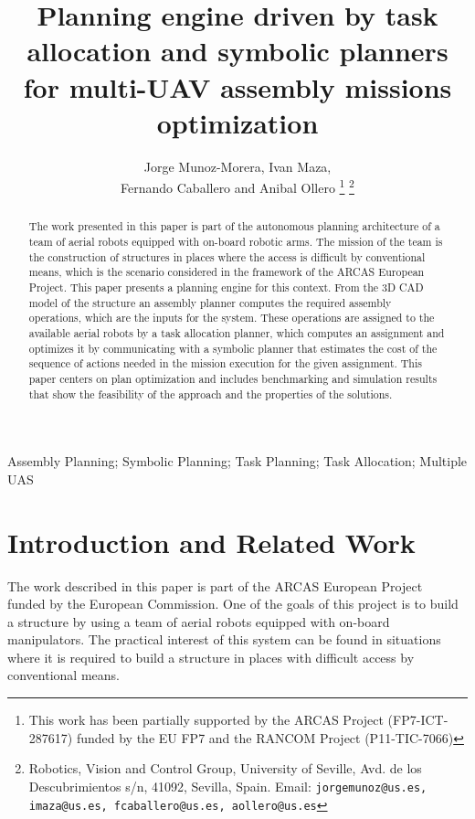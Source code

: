\documentclass[letterpaper, 12pt, conference]{ieeeconf}    %
\title{\LARGE \bf Planning engine driven by task allocation and symbolic planners for multi-UAV assembly missions optimization}
\author{Jorge Munoz-Morera, Ivan Maza, \\ Fernando Caballero and Anibal Ollero   %
\thanks{This work has been partially supported by the ARCAS Project (FP7-ICT-287617) funded by the EU FP7 and the RANCOM Project (P11-TIC-7066)} %
\thanks{Robotics, Vision and Control Group, University of Seville, Avd. de los Descubrimientos s/n, 41092, Sevilla, Spain. Email:
{\tt\small jorgemunoz@us.es, imaza@us.es, fcaballero@us.es, aollero@us.es}}
}
\begin{document}
\maketitle

\thispagestyle{empty}

\pagestyle{empty}

\begin{abstract}
The work presented in this paper is part of the autonomous planning architecture of a team of aerial robots equipped with on-board robotic arms. The mission of the team is the construction of structures in places where the access is difficult by conventional means, which is the scenario considered in the framework of the ARCAS European Project. This paper presents a planning engine for this context. From the 3D CAD model of the structure an assembly planner computes the required assembly operations, which are the inputs for the system. These operations are assigned to the available aerial robots by a task allocation planner, which computes an assignment and optimizes it by communicating with a symbolic planner that estimates the cost of the sequence of actions needed in the mission execution for the given assignment. This paper centers on plan optimization and includes benchmarking and simulation results that show the feasibility of the approach and the properties of the solutions.  
\end{abstract}
 

\begin{keywords}
Assembly Planning; Symbolic Planning; Task Planning; Task Allocation; Multiple UAS
\end{keywords}

\section{Introduction and Related Work}
\label{sec:intro}

The work described in this paper is part of the ARCAS European Project~\cite{kondak_ijars13} funded by the European Commission. One of the goals of this project is to build a structure by using a team of aerial robots equipped with on-board manipulators. The practical interest of this system can be found in situations where it is required to build a structure in places with difficult access by conventional means.
\end{document}
